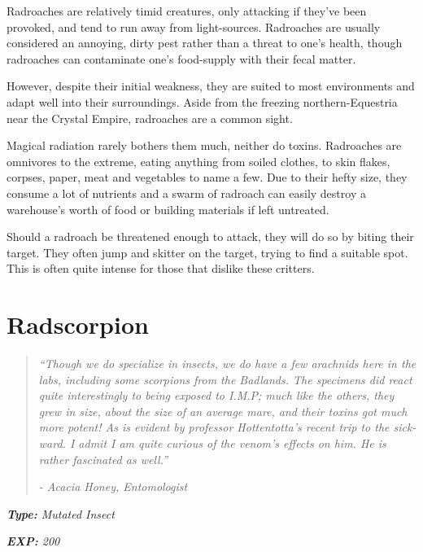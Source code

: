 \documentclass[11pt,a4paper,twocolumn]{book}
\begin{document}
	Radroaches are relatively timid creatures, only attacking if they've been provoked, and tend to run away from light-sources. Radroaches are usually considered an annoying, dirty pest rather than a threat to one's health, though radroaches can contaminate one's food-supply with their fecal matter.
	
	However, despite their initial weakness, they are suited to most environments and adapt well into their surroundings. Aside from the freezing northern-Equestria near the Crystal Empire, radroaches are a common sight. 
	
	Magical radiation rarely bothers them much, neither do toxins. Radroaches are omnivores to the extreme, eating anything from soiled clothes, to skin flakes, corpses, paper, meat and vegetables to name a few. Due to their hefty size, they consume a lot of nutrients and a swarm of radroach can easily destroy a warehouse's worth of food or building materials if left untreated.
	
	Should a radroach be threatened enough to attack, they will do so by biting their target. They often jump and skitter on the target, trying to find a suitable spot. This is often quite intense for those that dislike these critters.
	
	\clearpage
	
	\section*{Radscorpion}
	\begin{quote}
		\emph{``Though we do specialize in insects, we do have a few arachnids here in the labs, including some scorpions from the Badlands. The specimens did react quite interestingly to being exposed to I.M.P; much like the others, they grew in size, about the size of an average mare, and their toxins got much more potent! As is evident by professor Hottentotta's recent trip to the sick-ward. I admit I am quite curious of the venom's effects on him. He is rather fascinated as well.''}
		
		\emph{-	Acacia Honey, Entomologist}
	\end{quote}
	
	\emph{\textbf{Type:} Mutated Insect}
	
	\emph{\textbf{EXP:} 200}
	
\end{document}
